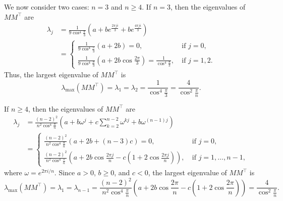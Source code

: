 \documentclass[smallextended, envcountsame]{svjour3}
\begin{document}
We now consider two cases: $n=3$ and $n\ge 4$.  If $n=3$, then the eigenvalues of $MM^\top$ are
\begin{align*}
    \lambda_j &= \frac{1}{9\cos^4\frac{\pi}{3}}\left(a+be^{\frac{2\pi ji}{3}}+be^{\frac{4\pi ji}{3}}\right)\\
    &= 
    \begin{cases}
        \frac{1}{9\cos^4\frac{\pi}{3}}\left(a+2b\right)=0,&~\text{if $j=0$},\\
        \frac{1}{9\cos^4\frac{\pi}{3}}\left(a+2b\cos\frac{2\pi}{3}\right)=\frac{1}{\cos^4\frac{\pi}{3}},&~\text{if $j=1,2$}.
    \end{cases}
\end{align*}
Thus, the largest eigenvalue of $MM^\top$ is 
\begin{equation*}
    \lambda_{\max}(MM^\top) = \lambda_1=\lambda_2=\frac{1}{\cos^4\frac{\pi}{3}}=\frac{4}{\cos^2\frac{\pi}{n}}.
\end{equation*}

If $n\ge 4$, then the eigenvalues of $MM^\top$ are
\begin{align*}
    \lambda_j &= \frac{(n-2)^2}{n^2\cos^4\frac{\pi}{n}}\left(a+b\omega^j+c\sum\limits_{k=2}^{n-2}\omega^{kj}+b\omega^{(n-1)j}\right)\\
    &= 
    \begin{cases}
        \frac{(n-2)^2}{n^2\cos^4\frac{\pi}{n}}\left(a+2b+(n-3)c\right)=0,&~\text{if $j=0$},\\
        \frac{(n-2)^2}{n^2\cos^4\frac{\pi}{n}}\left(a+2b\cos\frac{2\pi j}{n}-c\left(1+2\cos\frac{2\pi j}{n}\right)\right),&~\text{if $j=1,\ldots,n-1$},
    \end{cases}
\end{align*}
where $\omega=e^{2\pi i\slash n}$.
Since $a>0$, $b\ge0$, and $c<0$, the largest eigenvalue of $MM^\top$ is
\begin{equation*}
    \lambda_{\max}(MM^\top) = \lambda_1=\lambda_{n-1}=\frac{(n-2)^2}{n^2\cos^4\frac{\pi}{n}}\left(a+2b\cos\frac{2\pi}{n}-c\left(1+2\cos\frac{2\pi}{n}\right)\right)=\frac{4}{\cos^2\frac{\pi}{n}}.
\end{equation*}
\end{document}

